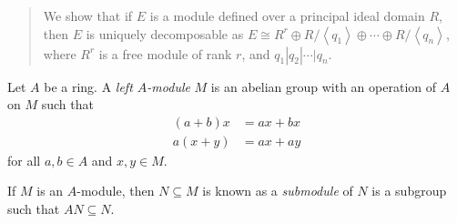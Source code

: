 \documentclass[10pt]{mypackage}
\begin{document}
\RaggedRight
\begin{abstract}
  \noindent We show that if $E$ is a module defined over a principal ideal domain $R$, then $E$ is uniquely decomposable as $E \cong R^{r}\oplus R/\left\langle q_1 \right\rangle\oplus \cdots \oplus R/\left\langle q_n \right\rangle$, where $R^{r}$ is a free module of rank $r$, and $q_1 | q_2 | \cdots | q_n$.
\end{abstract}
\begin{definition}
  Let $A$ be a ring. A \textit{left $A$-module} $M$ is an abelian group with an operation of $A$ on $M$ such that
  \begin{align*}
    \left( a + b \right)x &= ax + bx\\
    a\left( x + y \right) &= ax + ay
  \end{align*}
  for all $a,b\in A$ and $x,y\in M$.\newline

  If $M$ is an $A$-module, then $N\subseteq M$ is known as a \textit{submodule} of $N$ is a subgroup such that $AN \subseteq N$.
\end{definition}
\end{document}
